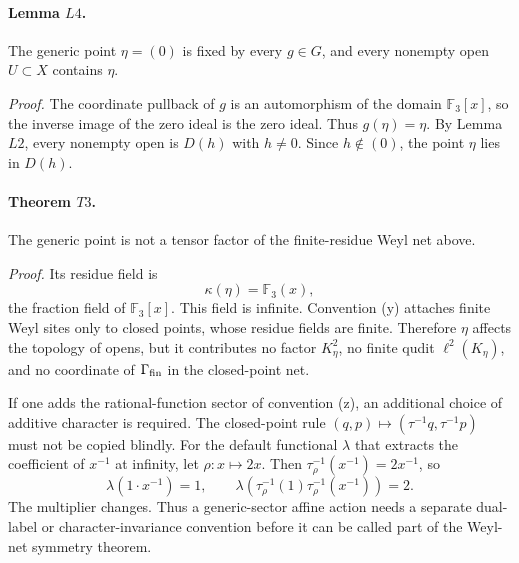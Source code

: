 \paragraph{Lemma \(L4\).}
The generic point \(\eta=(0)\) is fixed by every \(g\in G\), and every nonempty
open \(U\subset X\) contains \(\eta\).

\emph{Proof.}
The coordinate pullback of \(g\) is an automorphism of the domain
\(\mathbb F_3[x]\), so the inverse image of the zero ideal is the zero ideal.
Thus \(g(\eta)=\eta\).  By Lemma \(L2\), every nonempty open is \(D(h)\) with
\(h\ne0\).  Since \(h\notin(0)\), the point \(\eta\) lies in \(D(h)\).

\paragraph{Theorem \(T3\).}
The generic point is not a tensor factor of the finite-residue Weyl net above.

\emph{Proof.}
Its residue field is
\[
  \kappa(\eta)=\mathbb F_3(x),
\]
the fraction field of \(\mathbb F_3[x]\).  This field is infinite.  Convention
(y) attaches finite Weyl sites only to closed points, whose residue fields are
finite.  Therefore \(\eta\) affects the topology of opens, but it contributes
no factor \(K_\eta^2\), no finite qudit \(\ell^2(K_\eta)\), and no coordinate
of \(\Gamma_{\rm fin}\) in the closed-point net.

If one adds the rational-function sector of convention (z), an additional
choice of additive character is required.  The closed-point rule
\((q,p)\mapsto(\tau^{-1}q,\tau^{-1}p)\) must not be copied blindly.  For the
default functional \(\lambda\) that extracts the coefficient of \(x^{-1}\) at
infinity, let \(\rho:x\mapsto2x\).  Then \(\tau_\rho^{-1}(x^{-1})=2x^{-1}\), so
\[
  \lambda(1\cdot x^{-1})=1,\qquad
  \lambda(\tau_\rho^{-1}(1)\tau_\rho^{-1}(x^{-1}))=2.
\]
The multiplier changes.  Thus a generic-sector affine action needs a separate
dual-label or character-invariance convention before it can be called part of
the Weyl-net symmetry theorem.
